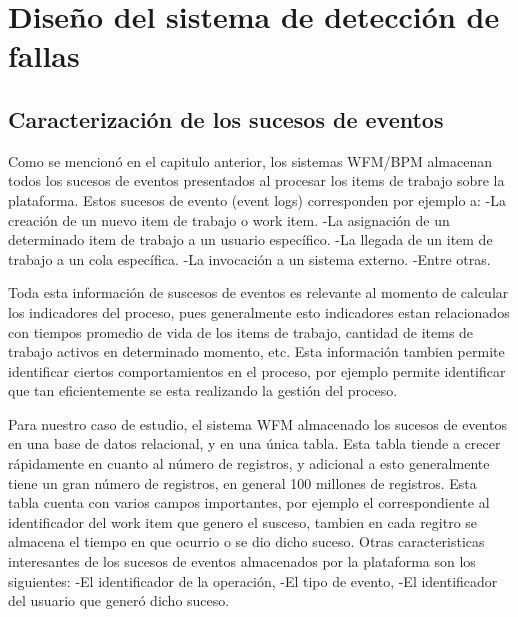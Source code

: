 
\chapter{Diseño del sistema de detección de fallas}

\ifpdf
    \graphicspath{{Chapter2/Figs/Raster/}{Chapter2/Figs/PDF/}{Chapter2/Figs/}}
\else
    \graphicspath{{Chapter2/Figs/Vector/}{Chapter2/Figs/}}
\fi


\section{Caracterización de los sucesos de eventos} %
\label{section2.1}

Como se mencionó en el capitulo anterior, los sistemas WFM/BPM almacenan todos los sucesos de eventos presentados al procesar los items de trabajo sobre la plataforma. Estos sucesos de evento (event logs)  corresponden por ejemplo a:
-La creación de un nuevo item de trabajo o work item.
-La asignación de un determinado item de trabajo a un usuario específico.
-La llegada de un item de trabajo a un cola específica. 
-La invocación a un sistema externo.
-Entre otras.

Toda esta información de suscesos de eventos es relevante al momento de calcular los indicadores del proceso, pues generalmente esto indicadores estan relacionados con tiempos promedio de vida de los items de trabajo, cantidad de items de trabajo activos en determinado momento, etc. Esta información tambien permite identificar ciertos comportamientos en el proceso, por ejemplo permite identificar que tan eficientemente se esta realizando la gestión del proceso. 

Para nuestro caso de estudio, el sistema WFM almacenado los sucesos de eventos en una base de datos relacional, y en una única tabla. Esta tabla tiende a crecer rápidamente en cuanto al número de registros, y adicional a esto generalmente tiene un gran número de registros, en general 100 millones de registros. Esta tabla cuenta con varios campos importantes, por ejemplo el correspondiente al identificador del work item que genero el susceso, tambien en cada regitro se almacena el tiempo en que ocurrio o se dio dicho suceso. Otras caracteristicas interesantes de los sucesos de eventos almacenados por la plataforma son los siguientes:
-El identificador de la operación, 
-El tipo de evento, 
-El identificador del usuario que generó dicho suceso.

